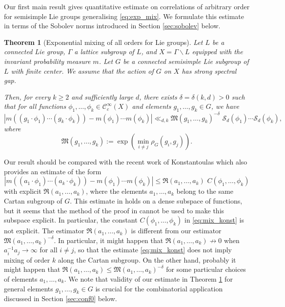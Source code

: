 \documentclass[11pt,reqno,a4paper]{amsart}
\numberwithin{equation}{section}
\newcommand{\cC}{\mathcal{C}}
\newcommand{\cS}{\mathcal{S}}
\theoremstyle{theorem}
\newtheorem{theorem}{Theorem}[section]
\theoremstyle{definition}
\begin{document}
Our first main result gives quantitative estimate on correlations
of arbitrary order for semisimple Lie groups generalising \eqref{eq:exp_mix}.
We formulate this estimate in terms of the Sobolev norms introduced in Section \ref{sec:sobolev} below.


\begin{theorem}[Exponential mixing of all orders for Lie groups]
\label{main1}
Let $L$ be a connected Lie group, $\Gamma$ a lattice subgroup of $L$,
and $X=\Gamma\backslash L$ equipped with the invariant probability measure $m$.
Let $G$ be a connected semisimple Lie subgroup of $L$ with finite center. We assume that the action of $G$ on $X$ has strong spectral gap.

Then, for every $k \geq 2$ and sufficiently large $d$, there exists $\delta=\delta(k,d) > 0$ such that for all functions $\phi_1,\ldots,\phi_k \in\cC_c^\infty(X)$ and elements $g_1,\ldots,g_k \in G$,
we have
\[
| m((g_1 \cdot \phi_1) \cdots (g_k \cdot \phi_k)) - m(\phi_1) \cdots m(\phi_k) |
\ll_{d,k}
\mathfrak{M}(g_1,\ldots,g_k)^{-\delta} \,\, \cS_d(\phi_1) \cdots \cS_d(\phi_k),
\]
where
$$
\mathfrak{M}(g_1,\ldots,g_k):=\exp\left(\min_{i\ne j}\rho_G(g_i,g_j)\right).
$$
\end{theorem}

Our result should be compared with the recent work of Konstantoulas \cite{konst}
which also provides an estimate of the form
\begin{equation}
\label{eq:mix_konst}
| m((a_1 \cdot \phi_1) \cdots (a_k \cdot \phi_k)) - m(\phi_1) \cdots m(\phi_k) |
\le 
\mathfrak{R}(a_1,\ldots,a_k) \,\, C(\phi_1,\ldots,\phi_k)
\end{equation}
with explicit $\mathfrak{R}(a_1,\ldots,a_k)$,
where the elements $a_1,\ldots,a_k$ belong to the same Cartan subgroup of $G$.
This estimate in \cite{konst} holds on a dense subspace of functions,
but it seems that the method of the proof in \cite{konst} cannot be used to make this subspace explicit. In particular, the constant $C(\phi_1,\ldots,\phi_k)$ in \eqref{eq:mix_konst} is not explicit.
The estimator $\mathfrak{R}(a_1,\ldots,a_k)$ is different from our estimator
$\mathfrak{M}(a_1,\ldots,a_k)^{-\delta}$. In particular, it might happen that 
$\mathfrak{R}(a_1,\ldots,a_k)\nrightarrow 0$ when $a_i^{-1}a_j\to \infty$ for all $i\ne j$, so that the estimate \eqref{eq:mix_konst} does not imply mixing 
of order $k$ along the Cartan subgroup.
On the other hand, probably it might happen that 
$\mathfrak{R}(a_1,\ldots,a_k)\le \mathfrak{M}(a_1,\ldots,a_k)^{-\delta}$ for some particular choices
of elements $a_1,\ldots,a_k$.
We note that validity of our estimate 
in Theorem \ref{main1} for general elements $g_1,\ldots,g_k\in G$ is crucial
for the combinatorial application discussed in Section \ref{sec:conf0} below.
\end{document}
